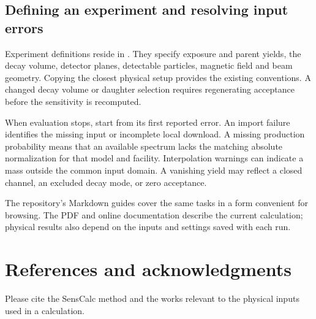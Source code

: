 \subsection{Defining an experiment and resolving input errors}
Experiment definitions reside in . They specify exposure and parent yields, the decay volume, detector planes, detectable particles, magnetic field and beam geometry. Copying the closest physical setup provides the existing conventions. A changed decay volume or daughter selection requires regenerating acceptance before the sensitivity is recomputed.

When evaluation stops, start from its first reported error. An import failure identifies the missing input or incomplete local download. A missing production probability means that an available spectrum lacks the matching absolute normalization for that model and facility. Interpolation warnings can indicate a mass outside the common input domain. A vanishing yield may reflect a closed channel, an excluded decay mode, or zero acceptance.

The repository's Markdown guides cover the same tasks in a form convenient for browsing. The PDF and online documentation describe the current calculation; physical results also depend on the inputs and settings saved with each run.

\section{References and acknowledgments}\label{sec:references}
Please cite the SensCalc method and the works relevant to the physical inputs used in a calculation.

